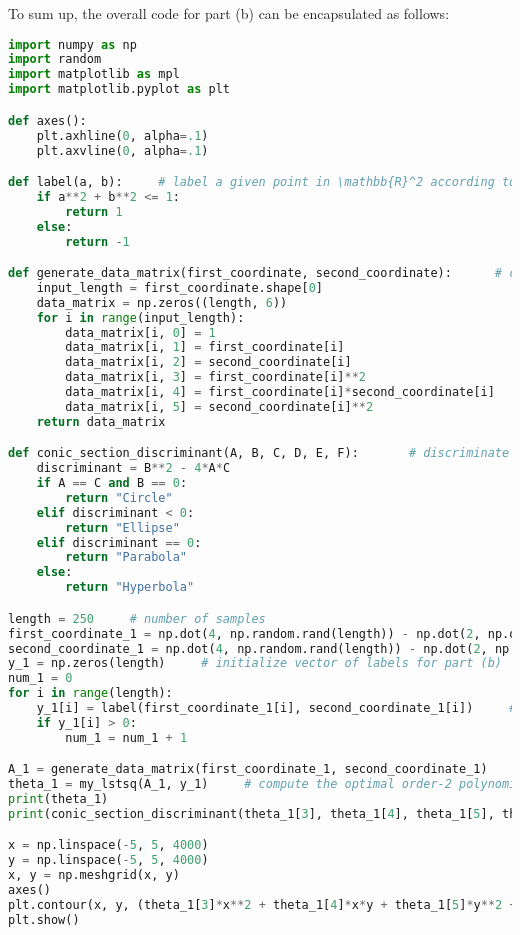 \documentclass[11pt]{article}
\begin{document}
\indent To sum up, the overall code for part (b) can be encapsulated as follows:
\begin{lstlisting}[language = Python]
import numpy as np
import random
import matplotlib as mpl
import matplotlib.pyplot as plt

def axes():
    plt.axhline(0, alpha=.1)
    plt.axvline(0, alpha=.1)

def label(a, b):     # label a given point in \mathbb{R}^2 according to the rule (4)
    if a**2 + b**2 <= 1:
        return 1
    else:
        return -1

def generate_data_matrix(first_coordinate, second_coordinate):      # construct a proper data matrix (2-dimensional array) of shape length \times 6
    input_length = first_coordinate.shape[0]
    data_matrix = np.zeros((length, 6))
    for i in range(input_length):
        data_matrix[i, 0] = 1
        data_matrix[i, 1] = first_coordinate[i]
        data_matrix[i, 2] = second_coordinate[i]
        data_matrix[i, 3] = first_coordinate[i]**2
        data_matrix[i, 4] = first_coordinate[i]*second_coordinate[i]
        data_matrix[i, 5] = second_coordinate[i]**2
    return data_matrix

def conic_section_discriminant(A, B, C, D, E, F):       # discriminate the conic section Ax^2 + Bxy + Cy^2 + Dx + Ey + F = 0
    discriminant = B**2 - 4*A*C
    if A == C and B == 0:
        return "Circle"
    elif discriminant < 0:
        return "Ellipse"
    elif discriminant == 0:
        return "Parabola"
    else:
        return "Hyperbola"

length = 250     # number of samples
first_coordinate_1 = np.dot(4, np.random.rand(length)) - np.dot(2, np.ones(length))       # the first coordinates of 250 samples chosen uniformly at random from [-2, 2] \times [-2, 2]
second_coordinate_1 = np.dot(4, np.random.rand(length)) - np.dot(2, np.ones(length))      # the second coordinates of 250 samples chosen uniformly at random from [-2, 2] \times [-2, 2]
y_1 = np.zeros(length)     # initialize vector of labels for part (b)
num_1 = 0
for i in range(length):
    y_1[i] = label(first_coordinate_1[i], second_coordinate_1[i])     # label the 250 random sample points according to the rule (4)
    if y_1[i] > 0:
        num_1 = num_1 + 1

A_1 = generate_data_matrix(first_coordinate_1, second_coordinate_1)
theta_1 = my_lstsq(A_1, y_1)     # compute the optimal order-2 polynomial that minimizes (3)
print(theta_1)
print(conic_section_discriminant(theta_1[3], theta_1[4], theta_1[5], theta_1[1], theta_1[2], theta_1[0]))     # discriminate the conic section formed as the zero set of the optimal order-2 polynomial that minimizes (3) (= the decision boundary)

x = np.linspace(-5, 5, 4000)
y = np.linspace(-5, 5, 4000)
x, y = np.meshgrid(x, y)
axes()
plt.contour(x, y, (theta_1[3]*x**2 + theta_1[4]*x*y + theta_1[5]*y**2 + theta_1[1]*x + theta_1[2]*y + theta_1[0]), [0], colors='k')
plt.show()
\end{lstlisting}
\end{document}
